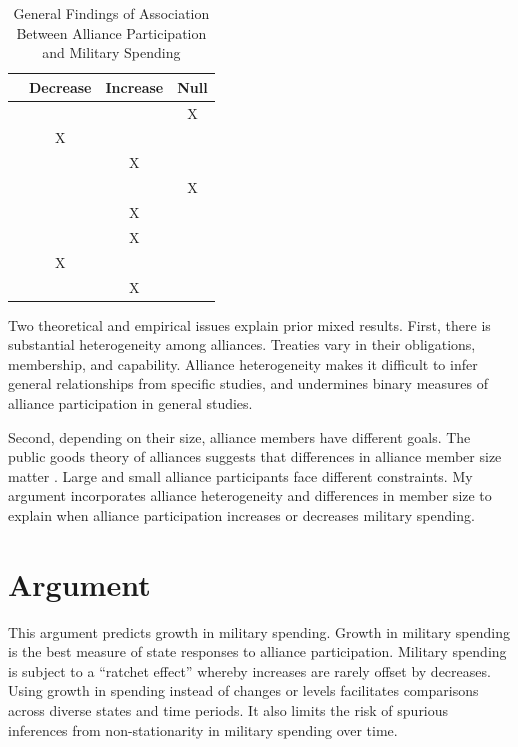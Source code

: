 \documentclass[12pt]{article}
\begin{document}
\begin{table}[hbt!]
\begin{center}
\begin{tabular}{lccc}
     & Decrease & Increase & Null \\
\hline
\citet{MostSiverson1987} &  &  & X \\
\citet{Conybeare1994} & X & &  \\
\citet{Diehl1994} &  & X &  \\
\citet{Goldsmith2003} &  &  & X \\
\citet{MorganPalmer2006} &  & X & \\ 
\citet{QuirozFlores2011} &  & X &  \\ 
\citet{DigiuseppePoast2016} & X &  & \\ 
\citet{Horowitzetal2017} &  & X & \\ 
\hline
\end{tabular}
\caption{General Findings of Association Between Alliance Participation and Military Spending}
\label{tab:results-sum}
\end{center} 
\end{table}


Two theoretical and empirical issues explain prior mixed results.
First, there is substantial heterogeneity among alliances.
Treaties vary in their obligations, membership, and capability. 
Alliance heterogeneity makes it difficult to infer general relationships from specific studies, and undermines binary measures of alliance participation in general studies. 
 

Second, depending on their size, alliance members have different goals. 
The public goods theory of alliances suggests that differences in alliance member size matter \citep{OlsonZeckhauser1966, DudleyMontmarquette1981, Garfinkel2004}. 
Large and small alliance participants face different constraints. 
My argument incorporates alliance heterogeneity and differences in member size to explain when alliance participation increases or decreases military spending. 



\section{Argument}

This argument predicts growth in military spending. 
Growth in military spending is the best measure of state responses to alliance participation. 
Military spending is subject to a ``ratchet effect'' whereby increases are rarely offset by decreases. 
Using growth in spending instead of changes or levels facilitates comparisons across diverse states and time periods. 
It also limits the risk of spurious inferences from non-stationarity in military spending over time. 
\end{document}
